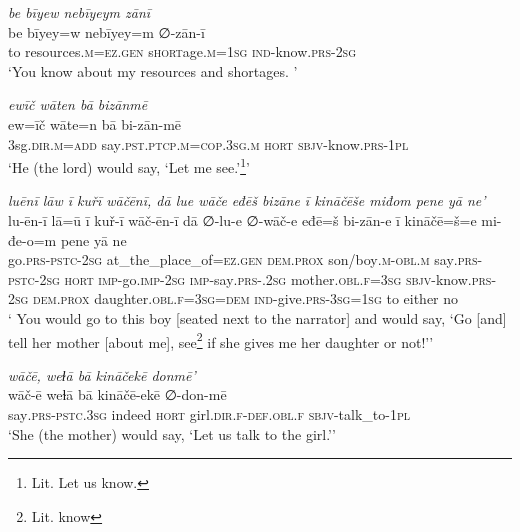 \ea \label{RE.6}
\textit{be bīyew nebīyeym zānī} \\ 
\gll be bīyey=w nebīyey=m ∅-zān-ī \\ 
 to resources\textsc{.m}\textsc{\textsc{=ez.gen}} s\textsc{hort}age\textsc{.m}\textsc{=\textsc{1sg}} \textsc{ind-}know\textsc{.prs}-\textsc{2sg} \\ 
\glt `You know about my resources and shortages. '
\z 
 
\ea \label{RE.51}
\textit{ewīč wāten bā bizānmē} \\ 
\gll ew=īč wāte=n bā bi-zān-mē \\ 
 3sg\textsc{.dir}\textsc{.m}\textsc{=add} say\textsc{.pst}\textsc{.ptcp}\textsc{.m}\textsc{=cop}\textsc{.3sg}\textsc{.m} \textsc{hort} \textsc{sbjv-}know\textsc{.prs}\textsc{-\textsc{1pl}} \\ 
\glt `He (the lord) would say, ‘Let me see.’\footnote{Lit. Let us know.}'
\z 
 
\ea \label{ŽE.74}
\textit{luēnī lāw ī kuřī wāčēnī, dā lue wāče eđēš bizāne ī kināčēše miđom pene yā ne’} \\ 
\gll lu-ēn-ī lā=ū ī kuř-ī wāč-ēn-ī dā ∅-lu-e ∅-wāč-e eđē=š bi-zān-e ī kināčē=š=e mi-đe-o=m pene yā ne \\ 
 go\textsc{.prs}\textsc{-pstc}-\textsc{2sg} at\_the\_place\_of\textsc{\textsc{=ez.gen}} \textsc{dem.prox} son/boy\textsc{.m}\textsc{-obl}\textsc{.m} say\textsc{.prs}\textsc{-pstc}-\textsc{2sg} \textsc{hort} \textsc{imp-}go.\textsc{imp-}\textsc{2sg} \textsc{imp-}say\textsc{.prs-}.\textsc{2sg} mother\textsc{.obl}\textsc{.f}\textsc{=3sg} \textsc{sbjv-}know\textsc{.prs}-\textsc{2sg} \textsc{dem.prox} daughter\textsc{.obl}\textsc{.f}\textsc{=3sg}\textsc{=dem} \textsc{ind-}give\textsc{.prs}\textsc{-3sg}\textsc{=\textsc{1sg}} to either no \\ 
\glt ` You would go to this boy [seated next to the narrator] and would say, ‘Go [and] tell her mother [about me], see\footnote{Lit. know} if she gives me her daughter or not!’'
\z 
 
\ea \label{ŽE.76}
\textit{wāčē, weɫā bā kināčekē donmē’} \\ 
\gll wāč-ē weɫā bā kināčē-ekē ∅-don-mē \\ 
 say\textsc{.prs-pstc}\textsc{.3sg} indeed \textsc{hort} girl\textsc{.dir}\textsc{.f}\textsc{-def}\textsc{.obl}\textsc{.f} \textsc{sbjv-}talk\_to\textsc{-1pl} \\ 
\glt `She (the mother) would say, ‘Let us talk to the girl.’'
\z 
 
